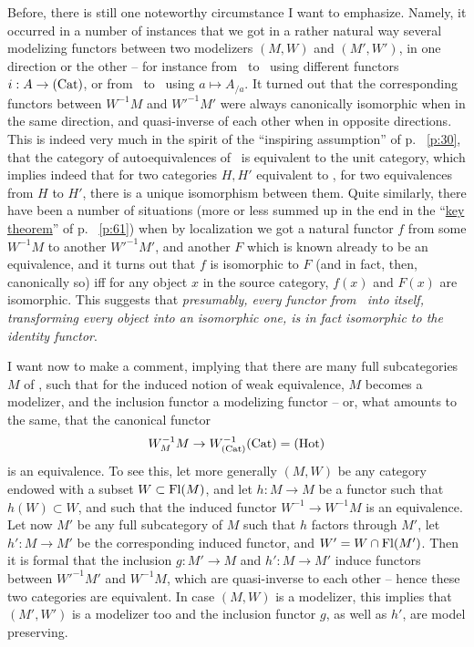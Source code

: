 Before, there is still one noteworthy circumstance I want to
emphasize. Namely, it occurred in a number of instances that we got in
a rather natural way several modelizing functors between two
modelizers $(M,W)$ and $(M',W')$, in one direction or the other -- for
instance from \Cat\ to \Ahat\ using different functors $i:A\to{\ensuremath{(\mathrm{Cat})}}$,
or from \Ahat\ to \Cat\ using $a\mapsto A_{/a}$. It turned out that
the corresponding functors between $W^{-1}M$ and $W'^{-1}M'$ were
always canonically isomorphic when in the same direction, and
quasi-inverse of each other when in opposite directions. This is
indeed very much in the spirit of the ``inspiring assumption'' of p.~%
\ref{p:30}, that the category of autoequivalences of \Hot\
is equivalent to the unit category, which implies indeed that for two
categories $H,H'$ equivalent to \Hot, for two equivalences from $H$ to
$H'$, there is a unique isomorphism between them. Quite similarly,
there have been a number of situations (more or less summed up in the
end in the ``\hyperref[thm:keyresult]{key theorem}'' of p.~%
\ref{p:61}) when by localization we got a natural functor
$f$ from some $W^{-1}M$ to another $W'^{-1}M'$, and another $F$ which
is known already to be an equivalence, and it turns out that $f$ is
isomorphic to $F$ (and in fact, then, canonically so) if{f} for any
object $x$ in the source category, $f(x)$ and $F(x)$ are
isomorphic. This suggests that \emph{presumably, every functor
  from \Hot\ into itself, transforming every object into an isomorphic
  one, is in fact isomorphic to the identity functor}.

I want now to make a comment, implying that there are many full
subcategories $M$ of \Cat, such that for the induced notion of weak
equivalence, $M$ becomes a modelizer, and the inclusion functor a
modelizing functor -- or, what amounts to the same, that the canonical
functor
\[W_M^{-1}M \to W_{(\mathrm{Cat})}^{-1}{(\mathrm{Cat})} = {(\mathrm{Hot})}\]
is an equivalence. To see this, let more generally $(M,W)$ be any
category endowed with a subset $W\subset\operatorname{Fl}(M)$, and let $h:M\to M$ be
a functor such that $h(W)\subset W$, and such that the induced functor
$W^{-1}\to W^{-1}M$ is an equivalence. Let now $M'$ be any full
subcategory of $M$ such that $h$ factors through $M'$, let $h' : M\to
M'$ be the corresponding induced functor, and $W'=W\mathbin{\cap}
\operatorname{Fl}(M')$. Then it is formal that the inclusion $g:M'\to
M$ and $h':M\to M'$ induce functors between $W'^{-1}M'$
and $W^{-1}M$, which are quasi-inverse to each other -- hence these
two categories are equivalent. In case $(M,W)$ is a modelizer, this
implies that $(M',W')$ is a modelizer too and the inclusion functor
$g$, as well as $h'$, are model preserving.

